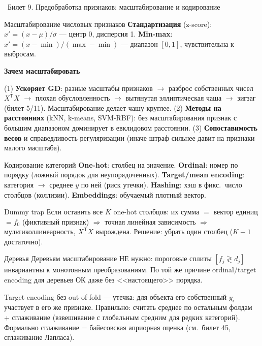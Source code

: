 \documentclass[12pt, a4paper]{article}
\newcommand{\bilet}[2]{%
  \vspace{10pt}%
  \noindent\colorbox{qcolor}{\parbox{\dimexpr\linewidth-2\fboxsep\relax}{%
    \color{white}\large\bfseries\strut\ Билет #1. #2%
  }}%
  \nopagebreak\vspace{5pt}\par\nopagebreak%
}
\newcommand{\qsub}[1]{%
  \vspace{5pt}%
  {\bfseries\color{defblue} #1}%
  \par\vspace{2pt}%
}
\newcommand{\tr}{^{\mathsf{T}}}
\begin{document}
\bilet{9}{Предобработка признаков: масштабирование и кодирование}

\begin{defbox}{Масштабирование числовых признаков}
\textbf{Стандартизация} (z-score): $x' = (x - \mu)/\sigma$ --- центр 0, дисперсия 1. \textbf{Min-max}: $x' = (x - \min)/(\max - \min)$ --- диапазон $[0,1]$, чувствительна к выбросам.
\end{defbox}

\qsub{Зачем масштабировать}
(1) \textbf{Ускоряет GD}: разные масштабы признаков $\to$ разброс собственных чисел $X\tr X$ $\to$ плохая обусловленность $\to$ вытянутая эллиптическая чаша $\to$ зигзаг (билет 5/11). Масштабирование делает чашу круглее. (2) \textbf{Методы на расстояниях} (kNN, k-means, SVM-RBF): без масштабирования признак с большим диапазоном доминирует в евклидовом расстоянии. (3) \textbf{Сопоставимость весов} и справедливость регуляризации (иначе штраф сильнее давит на признаки малого масштаба).

\begin{defbox}{Кодирование категорий}
\textbf{One-hot}: столбец на значение. \textbf{Ordinal}: номер по порядку (ложный порядок для неупорядоченных). \textbf{Target/mean encoding}: категория $\to$ среднее $y$ по ней (риск утечки). \textbf{Hashing}: хэш в фикс.\ число столбцов (коллизии). \textbf{Embeddings}: обучаемый плотный вектор.
\end{defbox}

\begin{propbox}{Dummy trap}
Если оставить все $K$ one-hot столбцов: их сумма $= $ вектор единиц $= f_0$ (фиктивный признак) $\Rightarrow$ точная линейная зависимость $\Rightarrow$ мультиколлинеарность, $X\tr X$ вырождена. Решение: убрать один столбец ($K{-}1$ достаточно).
\end{propbox}

\begin{rembox}{Деревья}
Деревьям масштабирование НЕ нужно: пороговые сплиты $[f_j \gtrless d_j]$ инвариантны к монотонным преобразованиям. По той же причине ordinal/target encoding для деревьев ОК даже без <<настоящего>> порядка.
\end{rembox}

\begin{fishkabox}
Target encoding без out-of-fold --- утечка: для объекта его собственный $y_i$ участвует в его же признаке. Правильно: считать среднее по остальным фолдам + сглаживание (взвешивание с глобальным средним для редких категорий). Формально сглаживание = байесовская априорная оценка (см.\ билет 45, сглаживание Лапласа).
\end{fishkabox}
\end{document}
